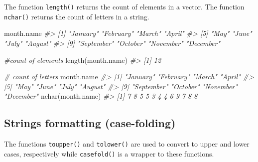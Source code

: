 \documentclass[
]{book}
\newenvironment{Shaded}{\begin{snugshade}}{\end{snugshade}}
\newcommand{\CommentTok}[1]{\textcolor[rgb]{0.56,0.35,0.01}{\textit{#1}}}
\newcommand{\FunctionTok}[1]{\textcolor[rgb]{0.00,0.00,0.00}{#1}}
\newcommand{\NormalTok}[1]{#1}
\begin{document}
The function \texttt{length()} returns the count of elements in a vector.
The function \texttt{nchar()} returns the count of letters in a string.

\begin{Shaded}
\begin{Highlighting}[]
\NormalTok{month.name}
\CommentTok{\#\textgreater{}  [1] "January"   "February"  "March"     "April"    }
\CommentTok{\#\textgreater{}  [5] "May"       "June"      "July"      "August"   }
\CommentTok{\#\textgreater{}  [9] "September" "October"   "November"  "December"}

\CommentTok{\#count of elements}
\FunctionTok{length}\NormalTok{(month.name)}
\CommentTok{\#\textgreater{} [1] 12}

\CommentTok{\# count of letters}
\NormalTok{month.name}
\CommentTok{\#\textgreater{}  [1] "January"   "February"  "March"     "April"    }
\CommentTok{\#\textgreater{}  [5] "May"       "June"      "July"      "August"   }
\CommentTok{\#\textgreater{}  [9] "September" "October"   "November"  "December"}
\FunctionTok{nchar}\NormalTok{(month.name)}
\CommentTok{\#\textgreater{}  [1] 7 8 5 5 3 4 4 6 9 7 8 8}
\end{Highlighting}
\end{Shaded}

\hypertarget{strings-formatting-case-folding}{%
\subsection{Strings formatting (case-folding)}\label{strings-formatting-case-folding}}

The functions \texttt{toupper()} and \texttt{tolower()} are used to convert to upper and lower cases, respectively while \texttt{casefold()} is a wrapper to these functions.
\end{document}
